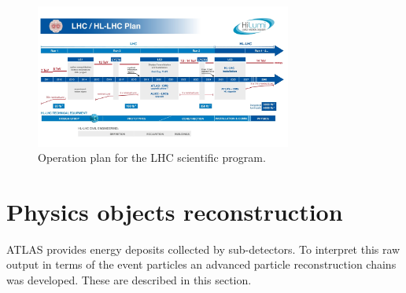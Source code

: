 \begin{figure}[htbp]
    \centering
    \includegraphics[width=0.75\textwidth]{Ch2/Img/HL-LHC-January-2021_small.jpg}
    \caption{Operation plan for the LHC scientific program.}
    \label{fig:chap2:Upgrad}
\end{figure}

\section{Physics objects reconstruction}
\label{chap2:Objects}
ATLAS provides energy deposits collected by sub-detectors. To interpret this raw output in terms of the event particles an advanced particle reconstruction chains was developed. These are described in this section.

